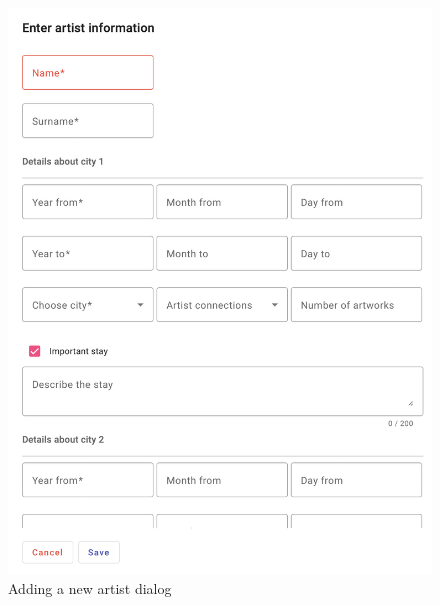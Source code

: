 \begin{figure}[hbt!]
    \begin{center}
        \includegraphics[width=\textwidth]{graphics/3-implementation/4}
    \end{center}
    \caption{Adding a new artist dialog}
    \label{fig:figure3.4}
\end{figure}

\clearpage